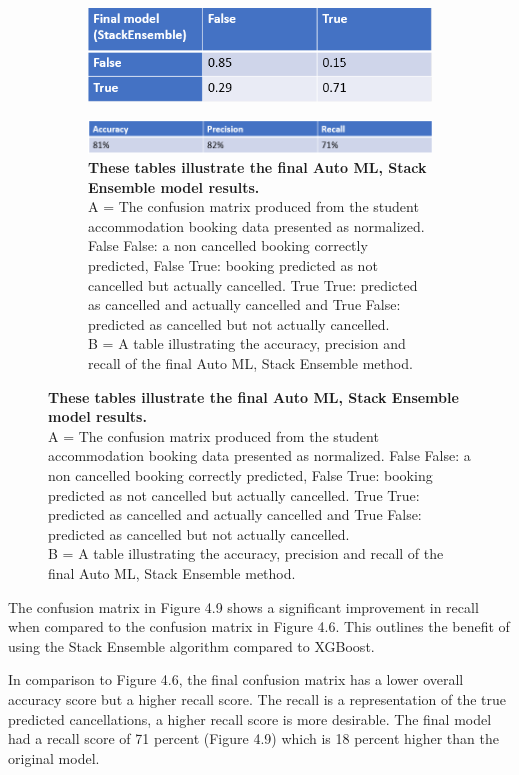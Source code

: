 \begin{figure}[H]
 \centering
  \begin{subfigure}{A\textwidth}
    \includegraphics[width=10cm]{figures/azure_ml_confusion_matrix.png}
  \end{subfigure}

  \centering
  \begin{subfigure}{B\textwidth}
    \includegraphics[width=10cm]{figures/final_recall.png}
    \caption{\textbf{These tables illustrate the final Auto ML, Stack Ensemble model results.}\vspace{2mm} \\ A = The confusion matrix produced from the student accommodation booking data presented as normalized. False False: a non cancelled booking correctly predicted, False True: booking predicted as not cancelled but actually cancelled. True True: predicted as cancelled and actually cancelled and True False: predicted as cancelled but not actually cancelled. \vspace{2mm} \\B = A table illustrating the accuracy, precision and recall of the final Auto ML, Stack Ensemble method.} \label{fig:1b}
  \end{subfigure}
\end{figure}

The confusion matrix in Figure 4.9 shows a significant improvement in recall when compared to the confusion matrix in Figure 4.6. This outlines the benefit of using the Stack Ensemble algorithm compared to XGBoost. 

\vspace{5mm}

In comparison to Figure 4.6, the final confusion matrix has a lower overall accuracy score but a higher recall score. The recall is a representation of the true predicted cancellations, a higher recall score is more desirable. The final model had a recall score of 71 percent (Figure 4.9) which is 18 percent higher than the original model. 

